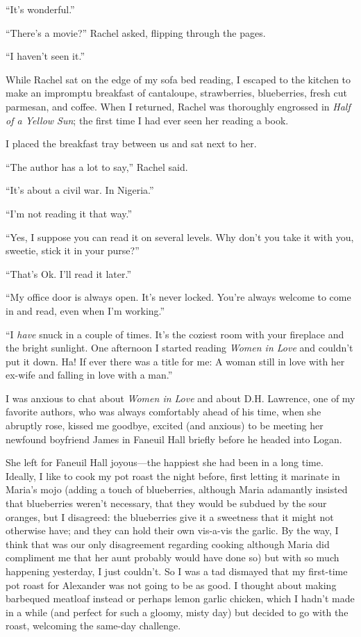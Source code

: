 ``It's wonderful.''

``There's a movie?'' Rachel asked, flipping through the pages.

``I haven't seen it.''

While Rachel sat on the edge of my sofa bed reading, I escaped to the
kitchen to make an impromptu breakfast of cantaloupe, strawberries,
blueberries, fresh cut parmesan, and coffee. When I returned, Rachel was
thoroughly engrossed in \emph{Half of a Yellow Sun}; the first time I
had ever seen her reading a book.

I placed the breakfast tray between us and sat next to her.

``The author has a lot to say,'' Rachel said.

``It's about a civil war. In Nigeria.''

``I'm not reading it that way.''

``Yes, I suppose you can read it on several levels. Why don't you take
it with you, sweetie, stick it in your purse?''

``That's Ok. I'll read it later.''

``My office door is always open. It's never locked. You're always
welcome to come in and read, even when I'm working.''

``I \emph{have} snuck in a couple of times. It's the coziest room with
your fireplace and the bright sunlight. One afternoon I started reading
\emph{Women in Love} and couldn't put it down. Ha! If ever there was a
title for me: A woman still in love with her ex-wife and falling in love
with a man.''

I was anxious to chat about \emph{Women in Love} and about D.H.
\linebreak Lawrence, one of my favorite authors, who was always comfortably ahead
of his time, when she abruptly rose, kissed me goodbye, excited (and
anxious) to be meeting her newfound boyfriend James in Faneuil Hall
briefly before he headed into Logan.

She left for Faneuil Hall joyous---the happiest she had been in a long
time.\\

Ideally, I like to cook my pot roast the night before, first letting it
marinate in Maria's mojo (adding a touch of blueberries, although Maria
adamantly insisted that blueberries weren't necessary, that they would
be subdued by the sour oranges, but I disagreed: the blueberries give it
a sweetness that it might not otherwise have; and they can hold their
own vis-a-vis the garlic. By the way, I think that was our only
disagreement regarding cooking although Maria did compliment me that her
aunt probably would have done so) but with so much happening yesterday,
I just couldn't. So I was a tad dismayed that my first-time pot roast
for Alexander was not going to be as good. I thought about making
barbequed meatloaf instead or perhaps lemon garlic chicken, which I
hadn't made in a while (and perfect for such a gloomy, misty day) but
decided to go with the roast, welcoming the same-day challenge.

